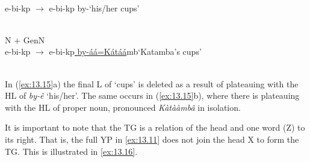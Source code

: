 \documentclass[output=paper]{langsci/langscibook}
\begin{document}
\ea\label{ex:13.15}
    \\
        e-bi-kp ${\rightarrow}$
        e-bi-kp by-\hfill‘his/her cups’\\
        \\\vspace{.75\baselineskip}
    \ex N $+$ GenN\\
        e-bi-kp ${\rightarrow}$
        e-bi-kp\underline{ by-áá=Kátáá}mb\hfill‘Katamba’s cups’\\
        \\\vspace{.75\baselineskip}
    \z
\z
In (\ref{ex:13.15}a) the final L of ‘cups’ is deleted as a result of
plateauing with the HL of \emph{by-ê} ‘his/her’. The same occurs in
(\ref{ex:13.15}b), where there is plateauing with the HL of proper noun,
pronounced \emph{Kàtààmbâ} in isolation.

It is important to note that the \gls{TG} is a relation of the head and one
word (Z) to its right. That is, the full YP in \eqref{ex:13.11} does not join
the head X to form the \gls{TG}. This is illustrated in \eqref{ex:13.16}.
\end{document}
